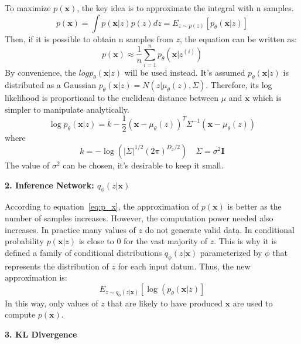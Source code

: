\documentclass[5p,sort&compress]{elsarticle}
\begin{document}
To maximize $p(\boldsymbol{x})$, the key idea is to approximate the integral with n samples.
\begin{equation}
p(\boldsymbol{x})=\int p(\boldsymbol{x} | z) p(z) d z = E_{z \sim p(z)}\left[p_{\theta}(\boldsymbol{x} | z)\right]
\end{equation}
Then, if it is possible to obtain n samples from $z$, the equation can be written as:
\begin{equation}\label{eq:p_x}
p(\boldsymbol{x}) \approx \frac{1}{n} \sum_{i=1}^{n} p_{\theta}(\boldsymbol{x} | z^{(i)})
\end{equation}
By convenience, the $log p_{\theta}(\boldsymbol{x}|z)$ will be used instead. It's assumed $p_{\theta}(\boldsymbol{x}|z)$ is distributed as a Gaussian $p_{\theta}(\boldsymbol{x}|z) = N(z|\mu_{\theta}(z), \Sigma)$. Therefore, its log likelihood is proportional to the euclidean distance between $\mu$ and $\boldsymbol{x}$ which is simpler to manipulate analytically.
\begin{equation}
\log p_{\theta}(\boldsymbol{x} | z)=k-\frac{1}{2}\left(\boldsymbol{x}-\mu_{\theta}(z)\right)^{T} \Sigma^{-1}\left(\boldsymbol{x}-\mu_{\theta}(z)\right)
\end{equation}
where
\begin{equation}
k=-\log \left(|\Sigma|^{1 / 2}(2 \pi)^{D_{x} / 2}\right) \quad \Sigma=\sigma^{2} \boldsymbol{I}
\end{equation}
The value of $\sigma^2$ can be chosen, it's desirable to keep it small.

\textbf{2. Inference Network: $q_{\phi}(z|\boldsymbol{x})$}

According to equation~\ref{eq:p_x}, the approximation of $p(\boldsymbol{x})$ is better as the number of samples increases. However, the computation power needed also increases. In practice many values of $z$ do not generate valid data. In conditional probability $p(\boldsymbol{x}|z)$ is close to 0 for the vast majority of $z$. This is why it is defined a family of conditional distributions $q_{\phi}(z|\boldsymbol{x})$ parameterized by $\phi$ that represents the distribution of $z$ for each input datum. Thus, the new approximation is:
\begin{equation}
E_{z \sim q_{\phi}(z | \boldsymbol{x})}\left[\log \left(p_{\theta}(\boldsymbol{x} | z)\right]\right.
\end{equation}
In this way, only values of $z$ that are likely to have produced $\boldsymbol{x}$ are used to compute $p(\boldsymbol{x})$.

\textbf{3. KL Divergence}
\end{document}

